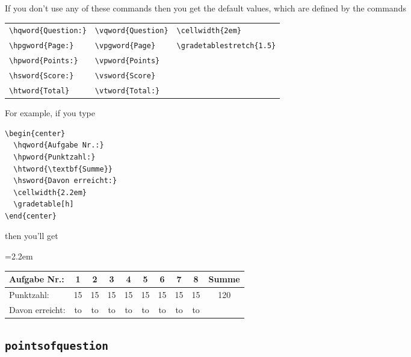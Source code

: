 \documentclass[12pt]{exam}
\begin{document}
If you don't use any of these commands then you get the default
values, which are defined by the commands
\begin{center}
\begin{tabular}{l@{\qquad}l@{\qquad}l}
  \verb"\hqword{Question:}"& \verb"\vqword{Question}"&
                             \verb"\cellwidth{2em}"\\
  \verb"\hpgword{Page:}"&    \verb"\vpgword{Page}"&
                           \verb"\gradetablestretch{1.5}"\\
  \verb"\hpword{Points:}"& \verb"\vpword{Points}"\\
  \verb"\hsword{Score:}"& \verb"\vsword{Score}"\\
  \verb"\htword{Total}"& \verb"\vtword{Total:}"
\end{tabular}
\end{center}

\medskip
For example, if you type
\begin{verbatim}
\begin{center}
  \hqword{Aufgabe Nr.:}
  \hpword{Punktzahl:}
  \htword{\textbf{Summe}}
  \hsword{Davon erreicht:}
  \cellwidth{2.2em}
  \gradetable[h]
\end{center}
\end{verbatim}
then you'll get
\begin{center}
  \cwidth=2.2em
  \renewcommand\arraystretch{1.5}
  \begin{tabular}{|l|c|c|c|c|c|c|c|c|c|}
    \hline
    Aufgabe Nr.:& 1& 2& 3& 4& 5& 6& 7& 8& \textbf{Summe}\\
    \hline
    Punktzahl:&
    15&
    15&
    15&
    15&
    15&
    15&
    15&
    15&
    120\\
    \hline
    Davon erreicht:&
    \hbox to \cwidth{\hfill}&
    \hbox to \cwidth{\hfill}&
    \hbox to \cwidth{\hfill}&
    \hbox to \cwidth{\hfill}&
    \hbox to \cwidth{\hfill}&
    \hbox to \cwidth{\hfill}&
    \hbox to \cwidth{\hfill}&
    \hbox to \cwidth{\hfill}&
    \\
    \hline
  \end{tabular}
\end{center}



\subsection{\texttt{pointsofquestion}}
\label{sec:pointsofq}
\end{document}
